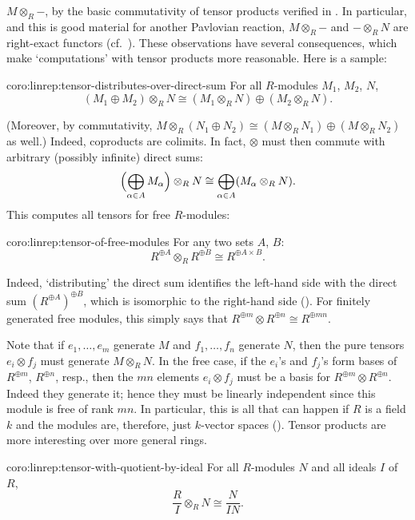 $M \otimes_R \mathord{-}$, by the basic commutativity of tensor
products verified in
. In
particular, and this is good material for another Pavlovian reaction,
$M \otimes_R \mathord{-}$ and $\mathord{-} \otimes_R N$ are
right-exact functors (cf.\
). These
observations have several consequences, which make `computations' with
tensor products more reasonable. Here is a sample:
\begin{coro}{}{coro:linrep:tensor-distributes-over-direct-sum}
  For all $R$-modules $M_1$, $M_2$, $N$,
  \[
    (M_1 \oplus M_2) \otimes_R N \cong (M_1 \otimes_R N) \oplus (M_2
    \otimes_R N).
  \]
\end{coro}

(Moreover, by commutativity,
$M \otimes_R (N_1 \oplus N_2) \cong (M \otimes_R N_1) \oplus (M
\otimes_R N_2)$ as well.) Indeed, coproducts are colimits. In fact,
$\otimes$ must then commute with arbitrary (possibly infinite) direct
sums:
\[
  \Bigl(\bigoplus_{\alpha \in A} M_\alpha\Bigr) \otimes_R N \cong
  \bigoplus_{\alpha \in A} (M_\alpha \otimes_R N).
\]
This computes all tensors for free $R$-modules:
\begin{coro}{}{coro:linrep:tensor-of-free-modules}
  For any two sets $A$, $B$:
  \[
    R^{\oplus A} \otimes_R R^{\oplus B} \cong R^{\oplus A \times B}.
  \]
\end{coro}

Indeed, `distributing' the direct sum identifies the left-hand side
with the direct sum $(R^{\oplus A})^{\oplus B}$, which is isomorphic
to the right-hand side
(). For finitely generated
free modules, this simply says that
$R^{\oplus m} \otimes R^{\oplus n} \cong R^{\oplus mn}$.

Note that if $e_1, \dots, e_m$ generate $M$ and $f_1, \dots, f_n$
generate $N$, then the pure tensors $e_i \otimes f_j$ must generate
$M \otimes_R N$. In the free case, if the $e_i$'s and $f_j$'s form
bases of $R^{\oplus m}$, $R^{\oplus n}$, resp., then the $mn$ elements
$e_i \otimes f_j$ must be a basis for
$R^{\oplus m} \otimes R^{\oplus n}$.  Indeed they generate it; hence
they must be linearly independent since this module is free of rank
$mn$. In particular, this is all that can happen if $R$ is a field $k$
and the modules are, therefore, just $k$-vector spaces
(). Tensor products are
more interesting over more general rings.
\begin{coro}{}{coro:linrep:tensor-with-quotient-by-ideal}
  For all $R$-modules $N$ and all ideals $I$ of $R$,
  \[
    \frac{R}{I} \otimes_R N \cong \frac{N}{IN}.
  \]
\end{coro}


